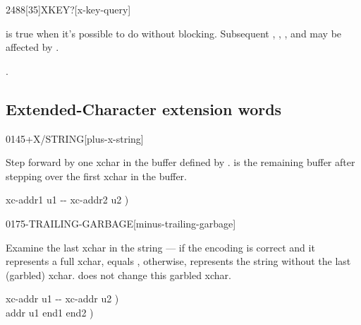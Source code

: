 \vspace*{-0.5ex}
\begin{worddef}[XKEYq]{2488}[35]{XKEY?}[x-key-query]
\item {}

	 is true when it's possible to do  without
	blocking.  Subsequent , ,
	, and  may be affected
	by .

\see {}.
\end{worddef}


\subsection{Extended-Character extension words} %
\extended

\begin{worddef}{0145}{+X/STRING}[plus-x-string]
\item {}

	Step forward by one xchar in the buffer defined by .
	 is the remaining buffer after stepping over the
	first xchar in the buffer.

	\begin{implement}
	\word{:}   xc-addr1 u1 -{}- xc-addr2 u2 ) \\
	\tab {}    \word{-}  \word{;}
	\end{implement}
\end{worddef}


\begin{worddef}{0175}{-TRAILING-GARBAGE}[minus-trailing-garbage]
\item {}

	Examine the last xchar in the string  --- if the
	encoding is correct and it represents a full xchar,  equals
	, otherwise,  represents the string without the
	last (garbled) xchar.   does not change this
	garbled xchar.

	\begin{implement}
	\word{:}   xc-addr u1 -{}- xc-addr u2 ) \\
	\tab {} \word{+}    addr u1 end1 end2 ) \\
	\tab {}    \word{-}  \word{+} \word{=}    \\
	\tab[2]  \\
	\tab {} \\
	\tab[2]    \word{-} \\
	\tab {} \word{;}
	\end{implement}
\end{worddef}


